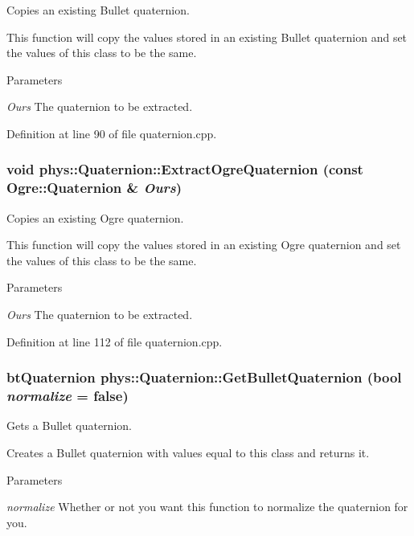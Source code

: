 Copies an existing Bullet quaternion. 

This function will copy the values stored in an existing Bullet quaternion and set the values of this class to be the same. 
\begin{DoxyParams}{Parameters}
\item[{\em Ours}]The quaternion to be extracted. \end{DoxyParams}


Definition at line 90 of file quaternion.cpp.

\hypertarget{classphys_1_1Quaternion_a942fab675a0b124e1dc5e2febab113e6}{
\subsubsection[{ExtractOgreQuaternion}]{\setlength{\rightskip}{0pt plus 5cm}void phys::Quaternion::ExtractOgreQuaternion (const Ogre::Quaternion \& {\em Ours})}}
\label{df/d8c/classphys_1_1Quaternion_a942fab675a0b124e1dc5e2febab113e6}


Copies an existing Ogre quaternion. 

This function will copy the values stored in an existing Ogre quaternion and set the values of this class to be the same. 
\begin{DoxyParams}{Parameters}
\item[{\em Ours}]The quaternion to be extracted. \end{DoxyParams}


Definition at line 112 of file quaternion.cpp.

\hypertarget{classphys_1_1Quaternion_a30944ae1fe905ee4f5c946c9a0b354f7}{
\subsubsection[{GetBulletQuaternion}]{\setlength{\rightskip}{0pt plus 5cm}btQuaternion phys::Quaternion::GetBulletQuaternion (bool {\em normalize} = {\ttfamily false})}}
\label{df/d8c/classphys_1_1Quaternion_a30944ae1fe905ee4f5c946c9a0b354f7}


Gets a Bullet quaternion. 

Creates a Bullet quaternion with values equal to this class and returns it. 
\begin{DoxyParams}{Parameters}
\item[{\em normalize}]Whether or not you want this function to normalize the quaternion for you. \end{DoxyParams}


